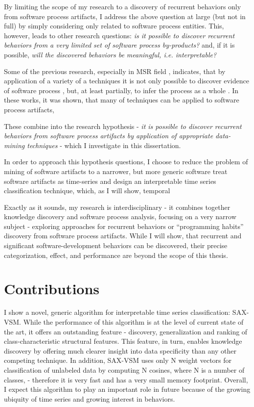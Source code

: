 By limiting the scope of my research to a discovery of recurrent behaviors only from software process 
artifacts, I address the above question at large (but not in full) by simply considering only related to software 
process entities.
This, however, leads to other research questions: 
\textit{is it possible to discover recurrent behaviors from a very limited set of software process by-products?} 
and, if it is possible, 
\textit{will the discovered behaviors be meaningful, i.e. interpretable?}

Some of the previous research, especially in MSR field  \cite{citeulike:9114115, citeulike:7853299}, 
indicates, that by application of a variety of a techniques it is not only possible to discover evidence of 
software process \cite{citeulike:9007622}, but, at least partially, to infer the process as a whole \cite{citeulike:5128808}. 
In these works, it was shown, that many of techniques can be applied to software process artifacts, 

These combine into the research hypothesis - \textit{it is possible to discover recurrent behaviors 
from software process artifacts by application of appropriate data-mining techniques} - 
which I investigate in this dissertation. 

In order to approach this hypothesis questions, I choose to reduce the problem of mining of software artifacts to a narrower,
but more generic software treat software artifacts as time-series and design an interpretable time 
series classification technique, which, 
as I will show, temporal 


Exactly as it sounds, my research is interdisciplinary - it combines together knowledge discovery and software process 
analysis, focusing on a very narrow subject - exploring approaches for recurrent behaviors or ``programming habits'' 
discovery from software process artifacts.
While I will show, that recurrent and significant software-development behaviors can be discovered,
their precise categorization, effect, and performance are beyond the scope of this thesis.

\section{Contributions}
I show a novel, generic algorithm for interpretable time series classification: SAX-VSM. 
While the performance of this algorithm is at the level of current state of the art, it offers an outstanding feature -
discovery, generalization and ranking of class-characteristic structural features. This feature, in turn, enables
knowledge discovery by offering much clearer insight into data specificity than any other competing technique.
In addition, SAX-VSM uses only N weight vectors for classification of unlabeled data by computing N cosines, where N is
a number of classes, - therefore it is very fast and has a very small memory footprint.
Overall, I expect this algorithm to play an important role in future because of the growing ubiquity of time series and
growing interest in behaviors.

